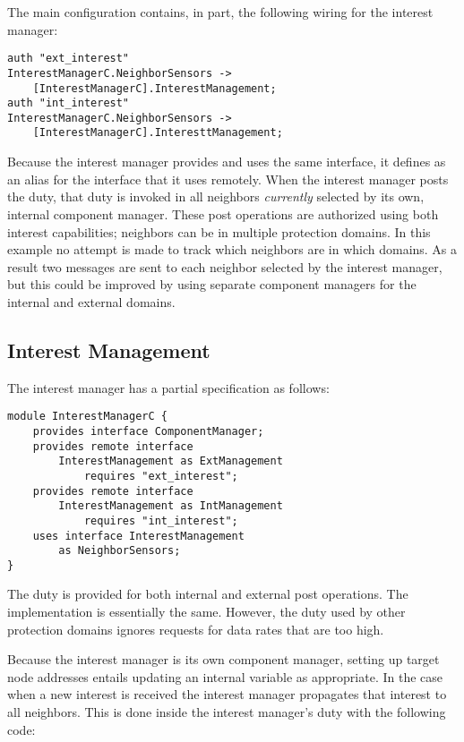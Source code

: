The main configuration contains, in part, the following wiring for the interest manager:
\begin{Verbatim}
auth "ext_interest"
InterestManagerC.NeighborSensors ->
    [InterestManagerC].InterestManagement;
auth "int_interest"
InterestManagerC.NeighborSensors ->
    [InterestManagerC].InteresttManagement;
\end{Verbatim}
\vspace{0.3em}

Because the interest manager provides and uses the same interface, it defines
 as an alias for the  interface that it uses
remotely. When the interest manager posts the  duty, that duty is invoked in
all neighbors \emph{currently} selected by its own, internal component manager. These post
operations are authorized using both interest capabilities; neighbors can be in multiple
protection domains. In this example no attempt is made to track which neighbors are in which
domains. As a result two messages are sent to each neighbor selected by the interest manager,
but this could be improved by using separate component managers for the internal and external
domains.

\subsection{Interest Management}

The interest manager has a partial specification as follows:
\begin{Verbatim}
module InterestManagerC {
    provides interface ComponentManager;
    provides remote interface
        InterestManagement as ExtManagement
            requires "ext_interest";
    provides remote interface
        InterestManagement as IntManagement
            requires "int_interest";
    uses interface InterestManagement
        as NeighborSensors;
}
\end{Verbatim}

The  duty is provided for both internal and external post operations. The
implementation is essentially the same. However, the duty used by other protection domains
ignores requests for data rates that are too high.

Because the interest manager is its own component manager, setting up target node addresses
entails updating an internal  variable as appropriate. In the case when a
new interest is received the interest manager propagates that interest to all neighbors. This is
done inside the interest manager's  duty with the following code:

